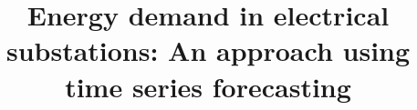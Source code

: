 %
%
%
%
%
%
\RequirePackage{fix-cm}
%
\documentclass[twocolumn]{svjour3}          %
%
\smartqed  %
%
\usepackage{graphicx}
\usepackage[numbers,sort&compress]{natbib}
\usepackage{rotating}
\usepackage{booktabs}
\usepackage[table,xcdraw]{xcolor}
\usepackage{array}
\usepackage{adjustbox}
\usepackage{subcaption}
\usepackage{svg}
\usepackage{multirow, array}


%
%
%
%
%


\title{Energy demand in electrical substations: An approach using time series forecasting%
}

